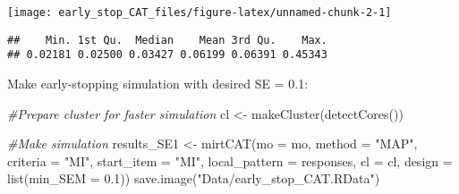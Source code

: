 \documentclass[
]{article}
\newenvironment{Shaded}{\begin{snugshade}}{\end{snugshade}}
\newcommand{\AttributeTok}[1]{\textcolor[rgb]{0.77,0.63,0.00}{#1}}
\newcommand{\CommentTok}[1]{\textcolor[rgb]{0.56,0.35,0.01}{\textit{#1}}}
\newcommand{\FloatTok}[1]{\textcolor[rgb]{0.00,0.00,0.81}{#1}}
\newcommand{\FunctionTok}[1]{\textcolor[rgb]{0.00,0.00,0.00}{#1}}
\newcommand{\NormalTok}[1]{#1}
\newcommand{\OtherTok}[1]{\textcolor[rgb]{0.56,0.35,0.01}{#1}}
\newcommand{\SpecialCharTok}[1]{\textcolor[rgb]{0.00,0.00,0.00}{#1}}
\newcommand{\StringTok}[1]{\textcolor[rgb]{0.31,0.60,0.02}{#1}}
\begin{document}
\begin{center}\texttt{[image: early\_stop\_CAT\_files/figure-latex/unnamed-chunk-2-1]} \end{center}

\begin{Shaded}
\end{Shaded}

\begin{verbatim}
##    Min. 1st Qu.  Median    Mean 3rd Qu.    Max. 
## 0.02181 0.02500 0.03427 0.06199 0.06391 0.45343
\end{verbatim}

Make early-stopping simulation with desired SE = 0.1:

\begin{Shaded}
\begin{Highlighting}[]
\CommentTok{\#Prepare cluster for faster simulation}
\NormalTok{cl }\OtherTok{\textless{}{-}} \FunctionTok{makeCluster}\NormalTok{(}\FunctionTok{detectCores}\NormalTok{())}

\CommentTok{\#Make simulation}
\NormalTok{results\_SE1 }\OtherTok{\textless{}{-}} \FunctionTok{mirtCAT}\NormalTok{(}\AttributeTok{mo =}\NormalTok{ mo, }\AttributeTok{method =} \StringTok{"MAP"}\NormalTok{, }\AttributeTok{criteria =} \StringTok{"MI"}\NormalTok{, }\AttributeTok{start\_item =} \StringTok{"MI"}\NormalTok{, }\AttributeTok{local\_pattern =}\NormalTok{ responses, }\AttributeTok{cl =}\NormalTok{ cl, }\AttributeTok{design =} \FunctionTok{list}\NormalTok{(}\AttributeTok{min\_SEM =} \FloatTok{0.1}\NormalTok{))}
\FunctionTok{save.image}\NormalTok{(}\StringTok{"Data/early\_stop\_CAT.RData"}\NormalTok{)}
\end{Highlighting}
\end{Shaded}
\end{document}
